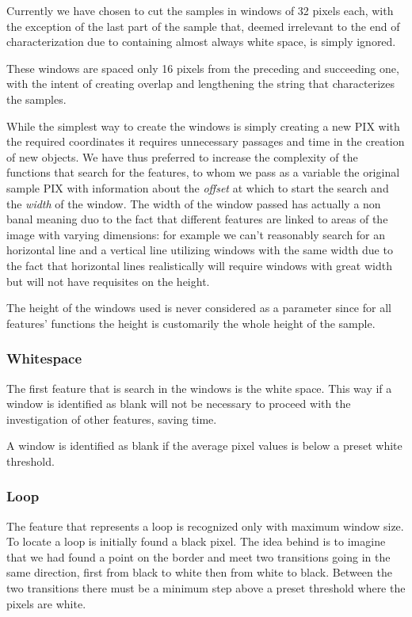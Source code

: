 Currently we have chosen to cut the samples in windows of 32 pixels each, with the exception of the last part of the sample that, deemed irrelevant to the end of characterization due to containing almost always white space, is simply ignored.

These windows are spaced only 16 pixels from the preceding and succeeding one, with the intent of creating overlap and lengthening the string that characterizes the samples.

While the simplest way to create the windows is simply creating a new PIX with the required coordinates it requires unnecessary passages and time in the creation of new objects. We have thus preferred to increase the complexity of the functions that search for the features, to whom we pass as a variable the original sample PIX with information about the \textit{offset} at which to start the search and the \textit{width} of the window. The width of the window passed has actually a non banal meaning duo to the fact that different features are linked to areas of the image with varying dimensions: for example we can't reasonably search for an horizontal line and a vertical line utilizing windows with the same width due to the fact that horizontal lines realistically will require windows with great width but will not have requisites on the height.

The height of the windows used is never considered as a parameter since for all features' functions the height is customarily the whole height of the sample.  

\subsubsection{Whitespace}  

The first feature that is search in the windows is the white space. This way if a window is identified as blank will not be necessary to proceed with the investigation of other features, saving time.

A window is identified as blank if the average pixel values is below a preset white threshold.

\subsubsection{Loop}

The feature that represents a loop is recognized only with maximum window size.
To locate a loop is initially found a black pixel. The idea behind is to imagine that we had found a point on the border and meet two transitions going in the same direction, first from black to white then from white to black. Between the two transitions there must be a minimum step above a preset threshold where the pixels are white.

